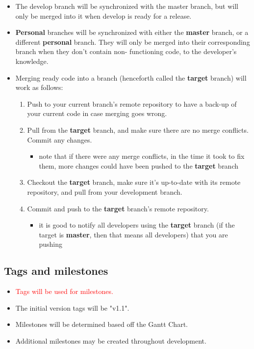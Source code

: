 \documentclass{article}
\begin{document}
\begin{itemize}
  \item The develop branch will be synchronized with the master branch, but will only be merged into it when develop is ready for a release.

  \item \textbf{Personal} branches will be synchronized with either the \textbf{master} branch, or a different \textbf{personal} branch. They will only be merged into their corresponding branch when they don't contain non- functioning code, to the developer's knowledge.

  \item Merging ready code into a branch (henceforth called the \textbf{target} branch) will work as follows:

  \begin{enumerate}
    \item Push to your current branch's remote repository to have a back-up of your current code in case merging goes wrong.

    \item Pull from the \textbf{target} branch, and make sure there are no merge conflicts. Commit any changes.

    \begin{itemize}
      \item note that if there were any merge conflicts, in the time it took to fix them, more changes could have been pushed to the \textbf{target} branch
    \end{itemize}

    \item Checkout the \textbf{target} branch, make sure it's up-to-date with its remote repository, and pull from your development branch.

    \item Commit and push to the \textbf{target} branch's remote repository.

    \begin{itemize}
      \item it is good to notify all developers using the \textbf{target} branch (if the target is \textbf{master}, then that means all developers) that you are pushing
    \end{itemize}
  \end{enumerate}
\end{itemize}

\subsection{Tags and milestones}
\begin{itemize}
  \item \textcolor{red}{Tags will be used for milestones.}

  \item The initial version tags will be "v1.1".

  \item Milestones will be determined based off the Gantt Chart.

  \item Additional milestones may be created throughout development.
\end{itemize}
\end{document}
